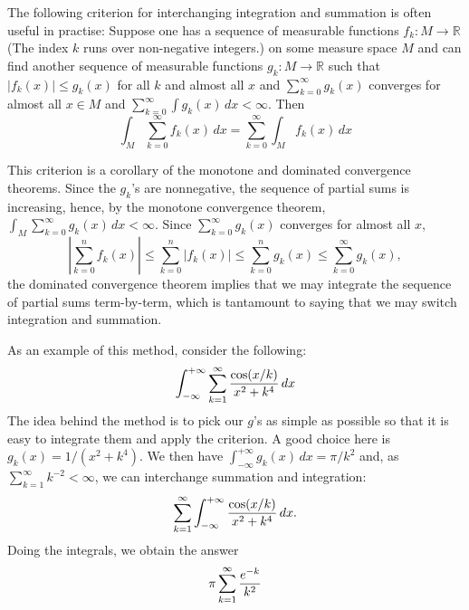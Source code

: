 \documentclass[12pt]{article}
\begin{document}
The following criterion for interchanging integration and summation
is often useful in practise:  Suppose one has a sequence of measurable
functions $f_k \colon M \to \mathbb{R}$ (The index $k$ runs over 
non-negative integers.) on some measure space $M$ 
and can find another sequence of measurable
functions $g_k \colon M \to \mathbb{R}$ such that $|f_k (x)| \le
g_k (x)$ for all $k$ and almost all $x$ and $\sum_{k=0}^\infty g_k(x)$ 
converges for almost all $x \in M$ and $\sum_{k=0}^\infty \int
g_k(x) \, dx < \infty$.  Then
 \[\int_M \sum_{k=0}^\infty f_k(x) \, dx = \sum_{k=0}^\infty 
 \int_M f_k(x) \, dx\]

This criterion is a corollary of the monotone and dominated
convergence theorems.  Since the $g_k$'s are nonnegative, the
sequence of partial sums is increasing, hence, by the monotone
convergence theorem, $\int_M \sum_{k=0}^\infty g_k(x) \, dx < \infty$. 
Since 
$\sum_{k=0}^\infty g_k(x)$ converges for almost all $x$, 
 \[ \left| \sum_{k=0}^n f_k(x) \right |\le  \sum_{k=0}^n |f_k(x)| \le
 \sum_{k=0}^n g_k(x) \le \sum_{k=0}^\infty g_k(x),\]
the dominated convergence theorem implies that we may integrate
the sequence of partial sums term-by-term, which is tantamount to
saying that we may switch integration and summation.

As an example of this method, consider the following:
 \[\int_{-\infty}^{+\infty} \sum_{k=1}^\infty {\cos (x/k) \over 
x^2 + k^4} \, dx\]
The idea behind the method is to pick our $g$'s as simple as possible
so that it is easy to integrate them and apply the criterion.  A good
choice here is $g_k (x) = 1 / (x^2 + k^4)$.  We then have $\int_{-\infty}^{+\infty} g_k (x) \, dx = \pi / k^2$ and, as
$\sum_{k=1}^\infty k^{-2} < \infty$, we can interchange summation
and integration:
 \[\sum_{k=1}^\infty \int_{-\infty}^{+\infty} {\cos (x/k) \over 
x^2 + k^4} \, dx.\]
Doing the integrals, we obtain the answer
 \[\pi \sum_{k=1}^\infty {e^{-k} \over k^2}\]
\end{document}
